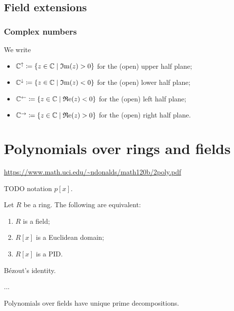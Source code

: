 \subsection{Field extensions}
\subsubsection{Complex numbers}
\begin{definition}
We write
\begin{itemize}
\item $\C^{\uparrow} \defeq \setbuilder{z\in\C}{\Im(z) > 0}$ for the (open) upper half plane;
\item $\C^{\downarrow} \defeq \setbuilder{z\in\C}{\Im(z) < 0}$ for the (open) lower half plane;
\item $\C^{\leftarrow} \defeq \setbuilder{z\in\C}{\Re(z) < 0}$ for the (open) left half plane;
\item $\C^{\rightarrow}  \defeq \setbuilder{z\in\C}{\Re(z) > 0}$ for the (open) right half plane.
\end{itemize}
\end{definition}

\section{Polynomials over rings and fields}
\url{https://www.math.uci.edu/~ndonalds/math120b/2poly.pdf}

TODO notation $p[x]$.

\begin{proposition}
Let $R$ be a ring. The following are equivalent:
\begin{enumerate}
\item $R$ is a field;
\item $R[x]$ is a Euclidean domain;
\item $R[x]$ is a PID.
\end{enumerate}
\end{proposition}
\begin{corollary}
Bézout's identity.

...
\end{corollary}


\begin{proposition}
Polynomials over fields have unique prime decompositions.
\end{proposition}

